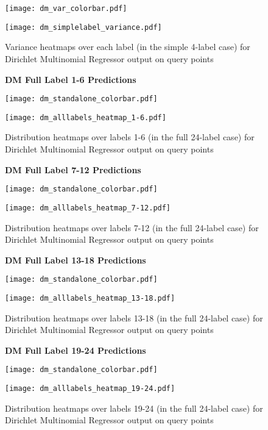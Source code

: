 \begin{figure}[H]
    \begin{minipage}{\linewidth}
        \centerline{\texttt{[image: dm\_var\_colorbar.pdf]}}
        \centerline{\texttt{[image: dm\_simplelabel\_variance.pdf]}}
        \caption{Variance heatmaps over each label (in the simple 4-label case) for Dirichlet Multinomial Regressor output on query points}
        \label{fig:dm_4label_variance}
    \end{minipage}
    \hfill
\end{figure}


\begin{figure}[H]
    \textbf{DM Full Label 1-6 Predictions}
    \centerline{\texttt{[image: dm\_standalone\_colorbar.pdf]}}
    \centerline{\texttt{[image: dm\_alllabels\_heatmap\_1-6.pdf]}}
    \caption{Distribution heatmaps over labels 1-6 (in the full 24-label case) for Dirichlet Multinomial Regressor output on query points}
    \label{fig:dm_24-1_label_heatmap}
    \hfill
\end{figure}

\begin{figure}[H]
    \textbf{DM Full Label 7-12 Predictions}
    \centerline{\texttt{[image: dm\_standalone\_colorbar.pdf]}}
    \centerline{\texttt{[image: dm\_alllabels\_heatmap\_7-12.pdf]}}
    \caption{Distribution heatmaps over labels 7-12 (in the full 24-label case) for Dirichlet Multinomial Regressor output on query points}
    \label{fig:dm_24-2_label_heatmap}
    \hfill
\end{figure}

\begin{figure}[H]
    \textbf{DM Full Label 13-18 Predictions}
    \centerline{\texttt{[image: dm\_standalone\_colorbar.pdf]}}
    \centerline{\texttt{[image: dm\_alllabels\_heatmap\_13-18.pdf]}}
    \caption{Distribution heatmaps over labels 13-18 (in the full 24-label case) for Dirichlet Multinomial Regressor output on query points}
    \label{fig:dm_24-3_label_heatmap}
    \hfill
\end{figure}

\begin{figure}[H]
    \textbf{DM Full Label 19-24 Predictions}
    \centerline{\texttt{[image: dm\_standalone\_colorbar.pdf]}}
    \centerline{\texttt{[image: dm\_alllabels\_heatmap\_19-24.pdf]}}
    \caption{Distribution heatmaps over labels 19-24 (in the full 24-label case) for Dirichlet Multinomial Regressor output on query points}
    \label{fig:dm_24-4_label_heatmap}
    \hfill
\end{figure}

